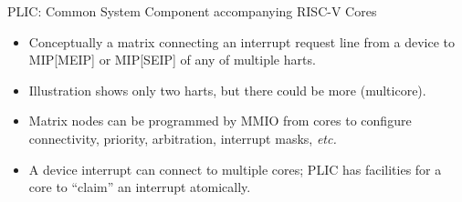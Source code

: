 \documentclass{article}
\newcommand{\etc}{\emph{etc.}}
\begin{document}
\begin{center}
  {\Huge
    PLIC: Common System Component accompanying RISC-V Cores}

  \vspace*{0.5in}


  \vspace*{0.5in}

  \begin{minipage}[t]{9in}
    \begin{itemize}\LARGE

    \item Conceptually a matrix connecting an interrupt request line
      from a device to MIP[MEIP] or MIP[SEIP] of any of multiple harts.

    \item Illustration shows only two harts, but there could be more (multicore).

    \item Matrix nodes can be programmed by MMIO from cores to
      configure connectivity, priority, arbitration, interrupt masks, {\etc}

    \item A device interrupt can connect to multiple cores; PLIC has
      facilities for a core to ``claim'' an interrupt atomically.
    \end{itemize}
  \end{minipage}
\end{center}

\clearpage

\end{document}

